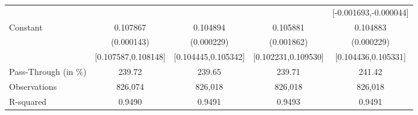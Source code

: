 {\begin{tabular}{l*{4}{c}}
                    &                     &                     &                     &[-0.001693,-0.000044]         \\
Constant            &    0.107867\sym{***}&    0.104894\sym{***}&    0.105881\sym{***}&    0.104883\sym{***}\\
                    &  (0.000143)         &  (0.000229)         &  (0.001862)         &  (0.000229)         \\
                    &[0.107587,0.108148]         &[0.104445,0.105342]         &[0.102231,0.109530]         &[0.104436,0.105331]         \\
\midrule
Pass-Through (in \%)&      239.72         &      239.65         &      239.71         &      241.42         \\
Observations        &     826,074         &     826,018         &     826,018         &     826,018         \\
R-squared           &      0.9490         &      0.9491         &      0.9493         &      0.9491         \\
\bottomrule
\end{tabular}
}
